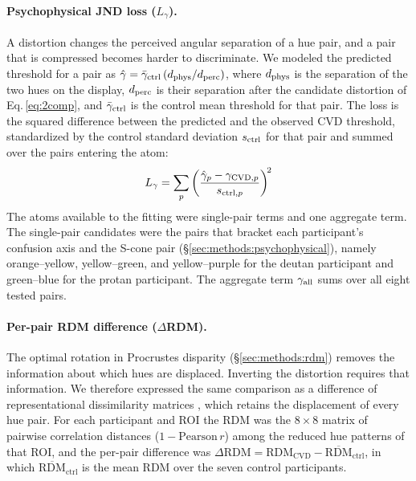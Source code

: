 \paragraph{Psychophysical JND loss ($L_\gamma$).}
A distortion changes the perceived angular separation of a hue pair, and a pair that is compressed becomes harder to discriminate. We modeled the predicted threshold for a pair as $\hat{\gamma} = \bar{\gamma}_{\rm ctrl}\,(d_{\rm phys} / d_{\rm perc})$, where $d_{\rm phys}$ is the separation of the two hues on the display, $d_{\rm perc}$ is their separation after the candidate distortion of Eq.\,\ref{eq:2comp}, and $\bar{\gamma}_{\rm ctrl}$ is the control mean threshold for that pair. The loss is the squared difference between the predicted and the observed CVD threshold, standardized by the control standard deviation $s_{\rm ctrl}$ for that pair and summed over the pairs entering the atom:
%
\begin{equation}
  L_\gamma = \sum_{p}\left(\frac{\hat{\gamma}_p - \gamma_{{\rm CVD},p}}{s_{{\rm ctrl},p}}\right)^{\!2}
  \label{eq:lgamma}
\end{equation}
%
The atoms available to the fitting were single-pair terms and one aggregate term. The single-pair candidates were the pairs that bracket each participant's confusion axis and the S-cone pair (\S\ref{sec:methods:psychophysical}), namely orange--yellow, yellow--green, and yellow--purple for the deutan participant and green--blue for the protan participant. The aggregate term $\gamma_{\rm all}$ sums over all eight tested pairs.

\paragraph{Per-pair RDM difference ($\Delta$RDM).}
The optimal rotation in Procrustes disparity (\S\ref{sec:methods:rdm}) removes the information about which hues are displaced. Inverting the distortion requires that information. We therefore expressed the same comparison as a difference of representational dissimilarity matrices \parencite{kriegeskorte2008}, which retains the displacement of every hue pair. For each participant and ROI the RDM was the $8 \times 8$ matrix of pairwise correlation distances ($1 - \text{Pearson}\,r$) among the reduced hue patterns of that ROI, and the per-pair difference was $\Delta\text{RDM} = \text{RDM}_\text{CVD} - \overline{\text{RDM}}_\text{ctrl}$, in which $\overline{\text{RDM}}_\text{ctrl}$ is the mean RDM over the seven control participants.

